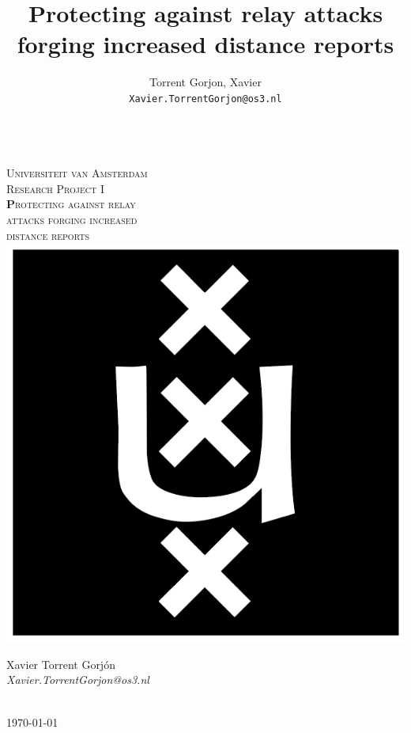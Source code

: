 \documentclass{article}
\author{
  Torrent Gorjon, Xavier\\
  \texttt{Xavier.TorrentGorjon@os3.nl}
}
\title{Protecting against relay attacks forging increased distance reports}
\begin{document}
\begin{titlepage}
\center
\textsc{}\\[1cm]
\textsc{\LARGE Universiteit van Amsterdam}\\[1.5cm]

\textsc{\Large Research Project I}\\[0.5cm]

\textsc{\Huge \textbf Protecting against relay\\[0cm] attacks forging increased\\[0.5cm] distance reports}\\[1.5cm]

\includegraphics[scale=1]{images/uva.png}\\[1cm]

\begin{minipage}{0.5 \textwidth}
\begin{center} \large
Xavier Torrent Gorj\'{o}n\\
\emph{Xavier.TorrentGorjon@os3.nl}\\[0.5cm]
\end{center}
\end{minipage}\\[2cm]
{\large \today} 


\end{titlepage}
\end{document}
